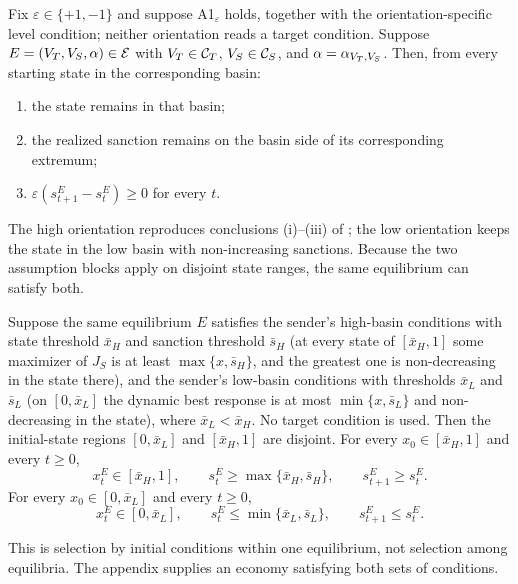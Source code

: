 \begin{theorem}
\label{thm:lowbasin}
Fix $\varepsilon\in\{+1,-1\}$ and suppose
A1$_\varepsilon$ holds, together with the orientation-specific level condition;
neither orientation reads a target condition. Suppose
$E=(V_T,V_S,\alpha)\in\mathcal E$ with
$V_T\in\mathcal C_T$, $V_S\in\mathcal C_S$, and
$\alpha=\alpha_{V_T,V_S}$. Then, from every starting state in the
corresponding basin:
\begin{enumerate}[label=(\roman*)]
\item the state remains in that basin;
\item the realized sanction remains on the basin side of its
corresponding extremum;
\item $\varepsilon(s^E_{t+1}-s^E_t)\ge0$ for every $t$.
\end{enumerate}
\end{theorem}

The high orientation reproduces conclusions (i)--(iii) of
; the low orientation keeps the state in the low basin with non-increasing
sanctions. Because the
two assumption blocks apply on disjoint state ranges, the same
equilibrium can satisfy both.

\begin{corollary}
\label{cor:initial-condition-selection}
Suppose the same equilibrium $E$ satisfies the sender's high-basin
conditions with state threshold $\bar x_H$ and sanction threshold
$\bar s_H$ (at every state of $[\bar x_H,1]$ some maximizer of
$J_S$ is at least $\max\{x,\bar s_H\}$, and the greatest one is
non-decreasing in the state there), and the sender's low-basin conditions
with thresholds $\bar x_L$ and $\bar s_L$ (on $[0,\bar x_L]$ the dynamic
best response is at most $\min\{x,\bar s_L\}$ and non-decreasing in the
state), where $\bar x_L<\bar x_H$. No target condition is used. Then the initial-state regions
$[0,\bar x_L]$ and $[\bar x_H,1]$ are disjoint. For every
$x_0\in[\bar x_H,1]$ and every $t\ge0$,
\[
x_t^E\in[\bar x_H,1],\qquad
s_t^E\ge\max\{\bar x_H,\bar s_H\},\qquad
s_{t+1}^E\ge s_t^E.
\]
For every $x_0\in[0,\bar x_L]$ and every $t\ge0$,
\[
x_t^E\in[0,\bar x_L],\qquad
s_t^E\le\min\{\bar x_L,\bar s_L\},\qquad
s_{t+1}^E\le s_t^E.
\]
\end{corollary}

This is selection by initial conditions within one equilibrium, not
selection among equilibria. The appendix supplies an economy satisfying
both sets of conditions.

